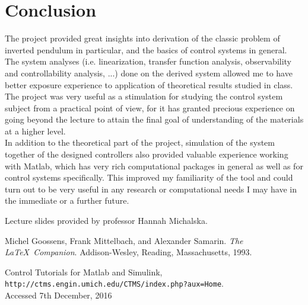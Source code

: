\documentclass [12pt,letterpaper]{exam}
\begin{document}
\section{Conclusion}
The project provided great insights into derivation of the classic problem of inverted pendulum in particular, and the basics of control systems in general. The system analyses (i.e. linearization, transfer function analysis, observability and controllability analysis, ...) done on the derived system allowed me to have better exposure experience to application of theoretical results studied in class. The project was very useful as a stimulation for studying the control system subject from a practical point of view, for it has granted precious experience on going beyond the lecture to attain the final goal of understanding of the materials at a higher level. \\
In addition to the theoretical part of the project, simulation of the system together of the designed controllers also provided valuable experience working with Matlab, which has very rich computational packages in general as well as for control systems specifically. This improved my familiarity of the tool and could turn out to be very useful in any research or computational needs I may have in the immediate or a further future.
\newpage


\begin{thebibliography}{9}

Lecture slides provided by professor Hannah Michalska. 

Michel Goossens, Frank Mittelbach, and Alexander Samarin. 
\textit{The \LaTeX\ Companion}. 
Addison-Wesley, Reading, Massachusetts, 1993.
 
Control Tutorials for Matlab and Simulink, \\
\texttt{http://ctms.engin.umich.edu/CTMS/index.php?aux=Home}. \\
Accessed 7th December, 2016
\end{thebibliography}
\end{document}
